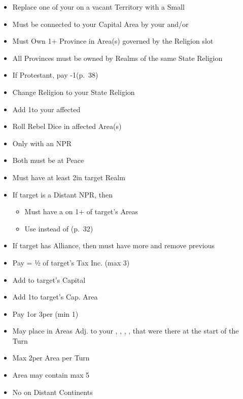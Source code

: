 \documentclass[10pt]{article}
\begin{document}
\begin{itemize}
	\item Replace one of your \claims on a vacant Territory with a Small \town
	\item Must be connected to your Capital Area by your \towns and/or \ships
\end{itemize}

\begin{itemize}
	\item Must Own 1+ Province in Area(s) governed by the Religion slot
	\item All Provinces must be owned by Realms of the same State Religion
	\item If Protestant, pay -1\adminpower (p.~38)
	\item Change Religion to your State Religion
	\item Add 1\unrest to your affected \towns
	\item Roll Rebel Dice in affected Area(s)
\end{itemize}

\begin{itemize}
	\item Only with an NPR
	\item Both must be at Peace
	\item Must have at least 2\influence in target Realm
	\item If target is a Distant NPR, then 
	\begin{itemize}
		\item Must have a \claim on 1+ of target's Areas
		\item Use \colonist instead of \influence (p.~32)
	\end{itemize}
	\item If target has Alliance, then must have more \influence and remove previous \alliance
	\item Pay \diplopower = ½ of target's Tax Inc. (max 3)
	\item Add \alliance to target's Capital
	\item Add 1\influence to target's Cap. Area
\end{itemize}

\begin{itemize}
	\item Pay 1\diplopower or 3\ducats per \influence (min 1\diplopower)
	\item May place \influence in Areas Adj. to your \towns, \vassals, \alliances, \marriages, \influence that were there at the start of the Turn
	\item Max 2\influence per Area per Turn
	\item Area may contain max 5\influence
	\item No \influence on Distant Continents
\end{itemize}
\end{document}
